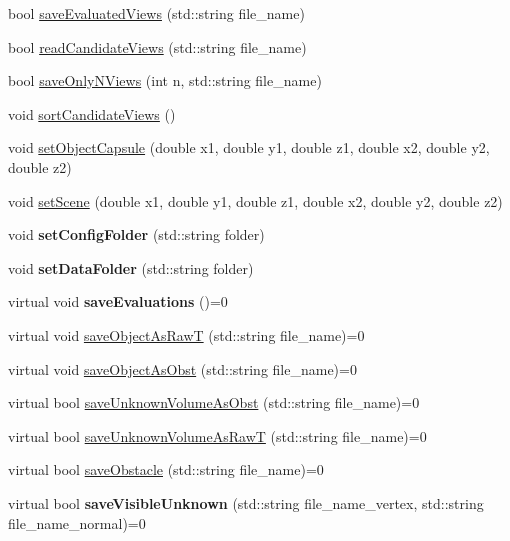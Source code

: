 \begin{DoxyCompactItemize}
\item 
bool \hyperlink{classPartialModelBase_a270503fb56c16b85f36c71f633513452}{save\+Evaluated\+Views} (std\+::string file\+\_\+name)
\item 
bool \hyperlink{classPartialModelBase_a3552efe44c5a12299c7462e35d9fd75e}{read\+Candidate\+Views} (std\+::string file\+\_\+name)
\item 
bool \hyperlink{classPartialModelBase_aa76eab3ce386966f7f65069c44f8f895}{save\+Only\+N\+Views} (int n, std\+::string file\+\_\+name)
\item 
void \hyperlink{classPartialModelBase_a745fab1e7b26b3a8f1efed66d69ef41a}{sort\+Candidate\+Views} ()
\item 
void \hyperlink{classPartialModelBase_a7dee7d3e7bb81092fa7f74709fb4996f}{set\+Object\+Capsule} (double x1, double y1, double z1, double x2, double y2, double z2)
\item 
void \hyperlink{classPartialModelBase_ac848bd32ebc54d49c9a8adb0d25e31ec}{set\+Scene} (double x1, double y1, double z1, double x2, double y2, double z2)
\item 
void {\bfseries set\+Config\+Folder} (std\+::string folder)\hypertarget{classPartialModelBase_a2b43f5a70a4c3ca94ee5c8939717b6ac}{}\label{classPartialModelBase_a2b43f5a70a4c3ca94ee5c8939717b6ac}

\item 
void {\bfseries set\+Data\+Folder} (std\+::string folder)\hypertarget{classPartialModelBase_a5a19a9366db46a1dfa95c8b2a9e1e8d3}{}\label{classPartialModelBase_a5a19a9366db46a1dfa95c8b2a9e1e8d3}

\item 
virtual void {\bfseries save\+Evaluations} ()=0\hypertarget{classPartialModelBase_a9cdef7a86e8c039520937eee049686a0}{}\label{classPartialModelBase_a9cdef7a86e8c039520937eee049686a0}

\item 
virtual void \hyperlink{classPartialModelBase_a193634a1ffbc43b60164dae988204d9e}{save\+Object\+As\+RawT} (std\+::string file\+\_\+name)=0
\item 
virtual void \hyperlink{classPartialModelBase_a994da889db902ef5948d9db48609d00b}{save\+Object\+As\+Obst} (std\+::string file\+\_\+name)=0
\item 
virtual bool \hyperlink{classPartialModelBase_a6b5f29ca5354d246ec08af21f764552e}{save\+Unknown\+Volume\+As\+Obst} (std\+::string file\+\_\+name)=0
\item 
virtual bool \hyperlink{classPartialModelBase_a2f0c03925d1afc098dede157d0876ee3}{save\+Unknown\+Volume\+As\+RawT} (std\+::string file\+\_\+name)=0
\item 
virtual bool \hyperlink{classPartialModelBase_ab41193a2a697dcf0d7d416cb35836458}{save\+Obstacle} (std\+::string file\+\_\+name)=0
\item 
virtual bool {\bfseries save\+Visible\+Unknown} (std\+::string file\+\_\+name\+\_\+vertex, std\+::string file\+\_\+name\+\_\+normal)=0\hypertarget{classPartialModelBase_a5304bbb21ba2a3bda34c300cfa628d36}{}\label{classPartialModelBase_a5304bbb21ba2a3bda34c300cfa628d36}


\end{DoxyCompactItemize}
